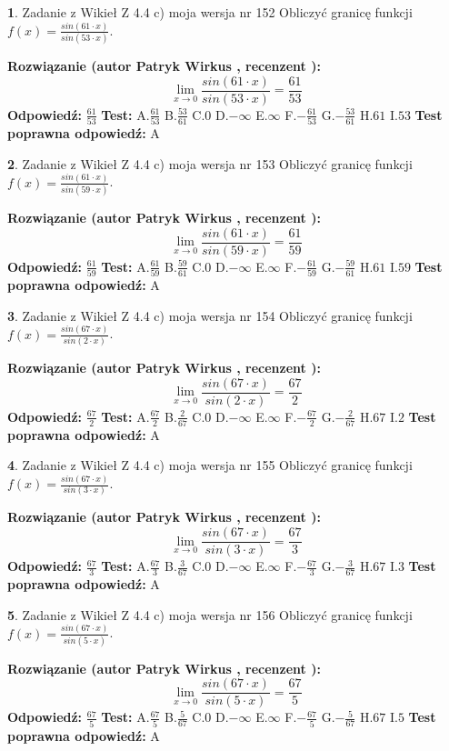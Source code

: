 \documentclass[12pt, a4paper]{article}
\theoremstyle{definition} %
\newtheorem{zad}{}
\newcommand{\zadStart}[1]{\begin{zad}#1\newline}
\newcommand{\zadStop}{\end{zad}}
\newcommand{\rozwStart}[2]{\noindent \textbf{Rozwiązanie (autor #1 , recenzent #2): }\newline}
\newcommand{\rozwStop}{\newline}
\newcommand{\odpStart}{\noindent \textbf{Odpowiedź:}\newline}
\newcommand{\odpStop}{\newline}
\newcommand{\testStart}{\noindent \textbf{Test:}\newline}
\newcommand{\testStop}{\newline}
\newcommand{\kluczStart}{\noindent \textbf{Test poprawna odpowiedź:}\newline}
\newcommand{\kluczStop}{\newline}
\begin{document}
\zadStart{Zadanie z Wikieł Z 4.4 c) moja wersja nr 152}
Obliczyć granicę funkcji $f(x)=\frac{sin(61\cdot x)}{sin(53\cdot x)}$.
\zadStop
\rozwStart{Patryk Wirkus}{}
$$\lim\limits_{x\to 0}\frac{sin(61\cdot x)}{sin(53\cdot x)}=
\frac{61}{53}$$
\rozwStop
\odpStart
$\frac{61}{53}$
\odpStop
\testStart
A.$\frac{61}{53}$
B.$\frac{53}{61}$
C.$0$
D.$-\infty$
E.$\infty$
F.$-\frac{61}{53}$
G.$-\frac{53}{61}$
H.$61$
I.$53$
\testStop
\kluczStart
A
\kluczStop



\zadStart{Zadanie z Wikieł Z 4.4 c) moja wersja nr 153}
Obliczyć granicę funkcji $f(x)=\frac{sin(61\cdot x)}{sin(59\cdot x)}$.
\zadStop
\rozwStart{Patryk Wirkus}{}
$$\lim\limits_{x\to 0}\frac{sin(61\cdot x)}{sin(59\cdot x)}=
\frac{61}{59}$$
\rozwStop
\odpStart
$\frac{61}{59}$
\odpStop
\testStart
A.$\frac{61}{59}$
B.$\frac{59}{61}$
C.$0$
D.$-\infty$
E.$\infty$
F.$-\frac{61}{59}$
G.$-\frac{59}{61}$
H.$61$
I.$59$
\testStop
\kluczStart
A
\kluczStop



\zadStart{Zadanie z Wikieł Z 4.4 c) moja wersja nr 154}
Obliczyć granicę funkcji $f(x)=\frac{sin(67\cdot x)}{sin(2\cdot x)}$.
\zadStop
\rozwStart{Patryk Wirkus}{}
$$\lim\limits_{x\to 0}\frac{sin(67\cdot x)}{sin(2\cdot x)}=
\frac{67}{2}$$
\rozwStop
\odpStart
$\frac{67}{2}$
\odpStop
\testStart
A.$\frac{67}{2}$
B.$\frac{2}{67}$
C.$0$
D.$-\infty$
E.$\infty$
F.$-\frac{67}{2}$
G.$-\frac{2}{67}$
H.$67$
I.$2$
\testStop
\kluczStart
A
\kluczStop



\zadStart{Zadanie z Wikieł Z 4.4 c) moja wersja nr 155}
Obliczyć granicę funkcji $f(x)=\frac{sin(67\cdot x)}{sin(3\cdot x)}$.
\zadStop
\rozwStart{Patryk Wirkus}{}
$$\lim\limits_{x\to 0}\frac{sin(67\cdot x)}{sin(3\cdot x)}=
\frac{67}{3}$$
\rozwStop
\odpStart
$\frac{67}{3}$
\odpStop
\testStart
A.$\frac{67}{3}$
B.$\frac{3}{67}$
C.$0$
D.$-\infty$
E.$\infty$
F.$-\frac{67}{3}$
G.$-\frac{3}{67}$
H.$67$
I.$3$
\testStop
\kluczStart
A
\kluczStop



\zadStart{Zadanie z Wikieł Z 4.4 c) moja wersja nr 156}
Obliczyć granicę funkcji $f(x)=\frac{sin(67\cdot x)}{sin(5\cdot x)}$.
\zadStop
\rozwStart{Patryk Wirkus}{}
$$\lim\limits_{x\to 0}\frac{sin(67\cdot x)}{sin(5\cdot x)}=
\frac{67}{5}$$
\rozwStop
\odpStart
$\frac{67}{5}$
\odpStop
\testStart
A.$\frac{67}{5}$
B.$\frac{5}{67}$
C.$0$
D.$-\infty$
E.$\infty$
F.$-\frac{67}{5}$
G.$-\frac{5}{67}$
H.$67$
I.$5$
\testStop
\kluczStart
A
\kluczStop
\end{document}
